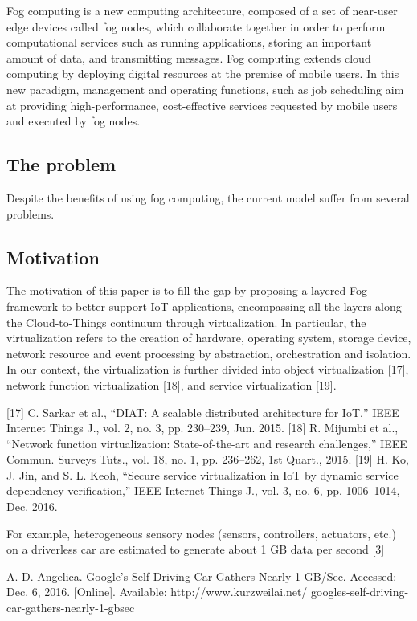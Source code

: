 Fog computing is a new computing architecture, composed of a set of
near-user edge devices called fog nodes, which collaborate together in
order to perform computational services such as running applications,
storing an important amount of data, and transmitting messages. Fog
computing extends cloud computing by deploying digital resources at
the premise of mobile users. In this new paradigm, management and
operating functions, such as job scheduling aim at providing high-performance,
cost-effective services requested by mobile users and executed
by fog nodes.


\subsection{The problem}
\noindent\tab Despite the benefits of using fog computing, the current model suffer from several problems. \cite{Armbrust:10} \\

\subsection{Motivation}
The motivation of this paper is to fill the gap by proposing
a layered Fog framework to better support IoT applications,
encompassing all the layers along the Cloud-to-Things continuum
through virtualization. In particular, the virtualization
refers to the creation of hardware, operating system, storage
device, network resource and event processing by abstraction,
orchestration and isolation. In our context, the virtualization is
further divided into object virtualization [17], network function
virtualization [18], and service virtualization [19].

[17] C. Sarkar et al., “DIAT: A scalable distributed architecture for IoT,”
IEEE Internet Things J., vol. 2, no. 3, pp. 230–239, Jun. 2015.
[18] R. Mijumbi et al., “Network function virtualization: State-of-the-art
and research challenges,” IEEE Commun. Surveys Tuts., vol. 18, no. 1,
pp. 236–262, 1st Quart., 2015.
[19] H. Ko, J. Jin, and S. L. Keoh, “Secure service virtualization in IoT
by dynamic service dependency verification,” IEEE Internet Things J.,
vol. 3, no. 6, pp. 1006–1014, Dec. 2016.

For example, heterogeneous sensory
nodes (sensors, controllers, actuators, etc.) on a driverless car
are estimated to generate about 1 GB data per second [3]

A. D. Angelica. Google’s Self-Driving Car Gathers Nearly 1 GB/Sec.
Accessed: Dec. 6, 2016. [Online]. Available: http://www.kurzweilai.net/
googles-self-driving-car-gathers-nearly-1-gbsec


